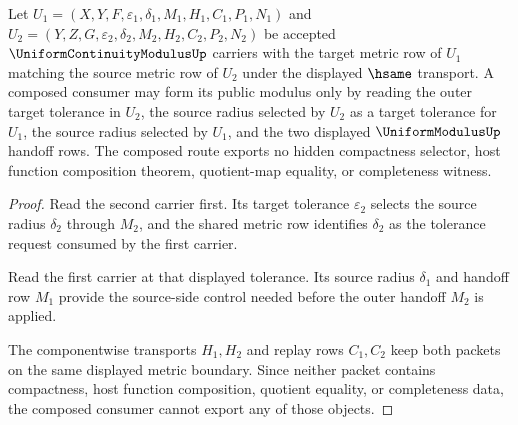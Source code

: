 \begin{theorem}
\label{thm:uniform-continuity-modulus-composition-stability}
Let $U_1=(X,Y,F,\varepsilon_1,\delta_1,M_1,H_1,C_1,P_1,N_1)$ and $U_2=(Y,Z,G,\varepsilon_2,\delta_2,M_2,H_2,C_2,P_2,N_2)$ be accepted $\UniformContinuityModulusUp$ carriers with the target metric row of $U_1$ matching the source metric row of $U_2$ under the displayed $\hsame$ transport. A composed consumer may form its public modulus only by reading the outer target tolerance in $U_2$, the source radius selected by $U_2$ as a target tolerance for $U_1$, the source radius selected by $U_1$, and the two displayed $\UniformModulusUp$ handoff rows. The composed route exports no hidden compactness selector, host function composition theorem, quotient-map equality, or completeness witness.
\end{theorem}
\begin{proof}
Read the second carrier first. Its target tolerance $\varepsilon_2$ selects the source radius $\delta_2$ through $M_2$, and the shared metric row identifies $\delta_2$ as the tolerance request consumed by the first carrier.

Read the first carrier at that displayed tolerance. Its source radius $\delta_1$ and handoff row $M_1$ provide the source-side control needed before the outer handoff $M_2$ is applied.

The componentwise transports $H_1,H_2$ and replay rows $C_1,C_2$ keep both packets on the same displayed metric boundary. Since neither packet contains compactness, host function composition, quotient equality, or completeness data, the composed consumer cannot export any of those objects.
\end{proof}




